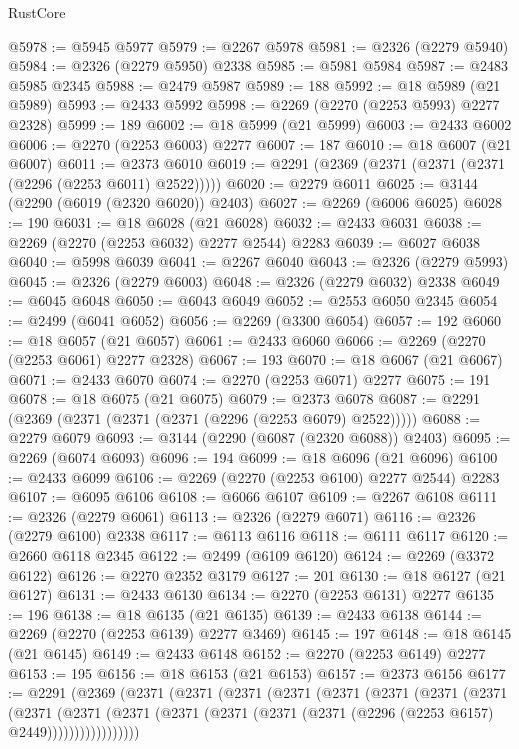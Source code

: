 \begin{lexlean}{RustCore}
\begin{coremodule}
@5978 := @5945 @5977
@5979 := @2267 @5978
@5981 := @2326 (@2279 @5940)
@5984 := @2326 (@2279 @5950) @2338
@5985 := @5981 @5984
@5987 := @2483 @5985 @2345
@5988 := @2479 @5987
@5989 := 188
@5992 := @18 @5989 (@21 @5989)
@5993 := @2433 @5992
@5998 := @2269 (@2270 (@2253 @5993) @2277 @2328)
@5999 := 189
@6002 := @18 @5999 (@21 @5999)
@6003 := @2433 @6002
@6006 := @2270 (@2253 @6003) @2277
@6007 := 187
@6010 := @18 @6007 (@21 @6007)
@6011 := @2373 @6010
@6019 := @2291 (@2369 (@2371 (@2371 (@2371 (@2296 (@2253 @6011) @2522)))))
@6020 := @2279 @6011
@6025 := @3144 (@2290 (@6019 (@2320 @6020)) @2403)
@6027 := @2269 (@6006 @6025)
@6028 := 190
@6031 := @18 @6028 (@21 @6028)
@6032 := @2433 @6031
@6038 := @2269 (@2270 (@2253 @6032) @2277 @2544) @2283
@6039 := @6027 @6038
@6040 := @5998 @6039
@6041 := @2267 @6040
@6043 := @2326 (@2279 @5993)
@6045 := @2326 (@2279 @6003)
@6048 := @2326 (@2279 @6032) @2338
@6049 := @6045 @6048
@6050 := @6043 @6049
@6052 := @2553 @6050 @2345
@6054 := @2499 (@6041 @6052)
@6056 := @2269 (@3300 @6054)
@6057 := 192
@6060 := @18 @6057 (@21 @6057)
@6061 := @2433 @6060
@6066 := @2269 (@2270 (@2253 @6061) @2277 @2328)
@6067 := 193
@6070 := @18 @6067 (@21 @6067)
@6071 := @2433 @6070
@6074 := @2270 (@2253 @6071) @2277
@6075 := 191
@6078 := @18 @6075 (@21 @6075)
@6079 := @2373 @6078
@6087 := @2291 (@2369 (@2371 (@2371 (@2371 (@2296 (@2253 @6079) @2522)))))
@6088 := @2279 @6079
@6093 := @3144 (@2290 (@6087 (@2320 @6088)) @2403)
@6095 := @2269 (@6074 @6093)
@6096 := 194
@6099 := @18 @6096 (@21 @6096)
@6100 := @2433 @6099
@6106 := @2269 (@2270 (@2253 @6100) @2277 @2544) @2283
@6107 := @6095 @6106
@6108 := @6066 @6107
@6109 := @2267 @6108
@6111 := @2326 (@2279 @6061)
@6113 := @2326 (@2279 @6071)
@6116 := @2326 (@2279 @6100) @2338
@6117 := @6113 @6116
@6118 := @6111 @6117
@6120 := @2660 @6118 @2345
@6122 := @2499 (@6109 @6120)
@6124 := @2269 (@3372 @6122)
@6126 := @2270 @2352 @3179
@6127 := 201
@6130 := @18 @6127 (@21 @6127)
@6131 := @2433 @6130
@6134 := @2270 (@2253 @6131) @2277
@6135 := 196
@6138 := @18 @6135 (@21 @6135)
@6139 := @2433 @6138
@6144 := @2269 (@2270 (@2253 @6139) @2277 @3469)
@6145 := 197
@6148 := @18 @6145 (@21 @6145)
@6149 := @2433 @6148
@6152 := @2270 (@2253 @6149) @2277
@6153 := 195
@6156 := @18 @6153 (@21 @6153)
@6157 := @2373 @6156
@6177 := @2291
    (@2369
      (@2371
        (@2371
          (@2371
            (@2371
              (@2371
                (@2371
                  (@2371
                    (@2371
                      (@2371
                        (@2371
                          (@2371
                            (@2371 (@2371 (@2371 (@2371 (@2296 (@2253 @6157) @2449)))))))))))))))))

\end{coremodule}
\end{lexlean}
